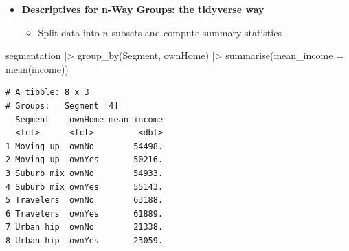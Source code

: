 \documentclass[
  ignorenonframetext,
]{beamer}
\newenvironment{Shaded}{\begin{snugshade}}{\end{snugshade}}
\newcommand{\AttributeTok}[1]{\textcolor[rgb]{0.40,0.45,0.13}{#1}}
\newcommand{\FunctionTok}[1]{\textcolor[rgb]{0.28,0.35,0.67}{#1}}
\newcommand{\NormalTok}[1]{\textcolor[rgb]{0.00,0.23,0.31}{#1}}
\newcommand{\SpecialCharTok}[1]{\textcolor[rgb]{0.37,0.37,0.37}{#1}}
\providecommand{\tightlist}{%
  \setlength{\itemsep}{0pt}\setlength{\parskip}{0pt}}\usepackage{longtable,booktabs,array}
\begin{document}
\begin{frame}[fragile]{}
\label{section-9}
\begin{itemize}
\item
  \textbf{Descriptives for n-Way Groups: the tidyverse way}

  \begin{itemize}
  \tightlist
  \item
    Split data into \(n\) subsets and compute summary statistics
  \end{itemize}
\end{itemize}

\tiny

\begin{Shaded}
\begin{Highlighting}[]
\NormalTok{segmentation }\SpecialCharTok{|\textgreater{}} 
  \FunctionTok{group\_by}\NormalTok{(Segment, ownHome) }\SpecialCharTok{|\textgreater{}}
  \FunctionTok{summarise}\NormalTok{(}\AttributeTok{mean\_income =} \FunctionTok{mean}\NormalTok{(income))}
\end{Highlighting}
\end{Shaded}

\begin{verbatim}
# A tibble: 8 x 3
# Groups:   Segment [4]
  Segment    ownHome mean_income
  <fct>      <fct>         <dbl>
1 Moving up  ownNo        54498.
2 Moving up  ownYes       50216.
3 Suburb mix ownNo        54933.
4 Suburb mix ownYes       55143.
5 Travelers  ownNo        63188.
6 Travelers  ownYes       61889.
7 Urban hip  ownNo        21338.
8 Urban hip  ownYes       23059.
\end{verbatim}
\end{frame}
\end{document}
